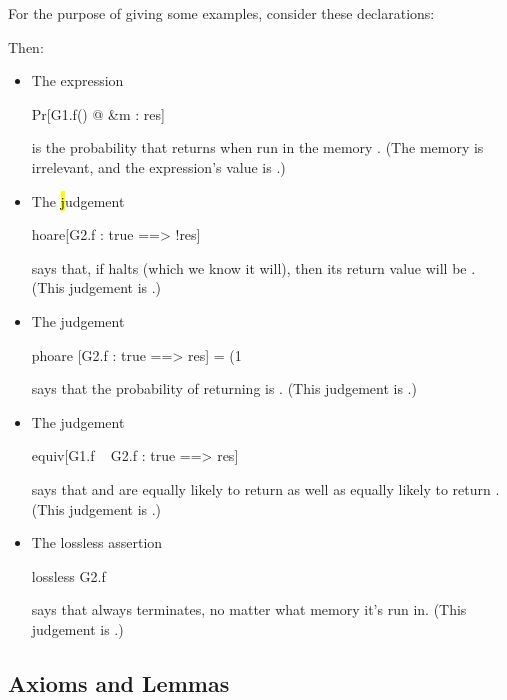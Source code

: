 For the purpose of giving some examples, consider these declarations:
Then:
\begin{itemize}
\item The expression
\begin{easycrypt}{}{}
Pr[G1.f() @ &m : res]
\end{easycrypt}
is the probability that  returns  when run
in the memory . (The memory is irrelevant, and the expression's
value is .)

\item The \hl judgement
\begin{easycrypt}{}{}
hoare[G2.f : true ==> !res]
\end{easycrypt}
says that, if  halts (which we know it will), then
its return value will be . (This judgement is .)

\item The \phl judgement
\begin{easycrypt}{}{}
phoare [G2.f : true ==> res] = (1%
\end{easycrypt}
says that the probability of  returning  is
. (This judgement is .)

\item The \prhl judgement
\begin{easycrypt}{}{}
equiv[G1.f ~ G2.f : true ==> res]
\end{easycrypt}
says that  and  are equally likely to return
 as well as equally likely to return .
(This judgement is .)

\item The lossless assertion
\begin{easycrypt}{}{}
lossless G2.f    
\end{easycrypt}
says that  always terminates, no matter what memory it's
run in. (This judgement is .)
\end{itemize}

\subsection{Axioms and Lemmas}

